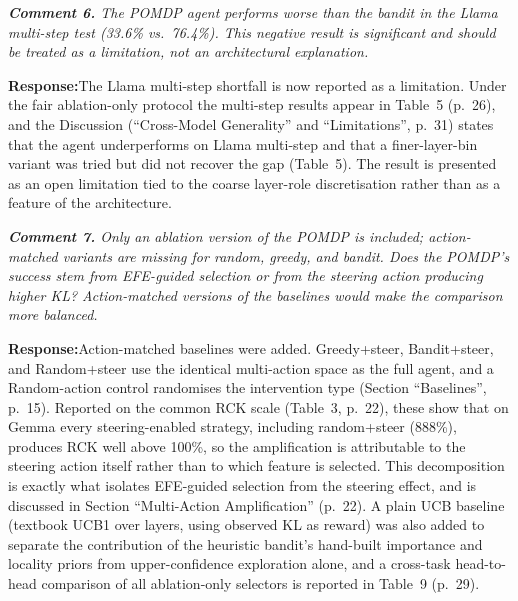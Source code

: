\documentclass[11pt]{article}
\newenvironment{comment}{%
  \def\FrameCommand{{\color{commentrule}\vrule width 3pt}\hspace{0pt}%
    \fboxsep=8pt\colorbox{commentbg}}%
  \MakeFramed{\advance\hsize-\width\FrameRestore}%
  \itshape\small}{\endMakeFramed}
\newcommand{\reviewerpoint}[1]{\medskip\noindent\textbf{Comment #1.}\;}
\newcommand{\response}{\par\smallskip\noindent\textbf{Response:}\;}
\begin{document}
\begin{comment}
\reviewerpoint{6} The POMDP agent performs worse than the bandit in the Llama
multi-step test (33.6\% vs.\ 76.4\%). This negative result is significant and
should be treated as a limitation, not an architectural explanation.
\end{comment}
\response The Llama multi-step shortfall is now reported as a limitation.
Under the fair ablation-only protocol the multi-step results appear in Table~5
(p.~26), and the Discussion (``Cross-Model Generality'' and ``Limitations'',
p.~31) states that the agent underperforms on Llama multi-step and that a
finer-layer-bin variant was tried but did not recover the gap (Table~5). The
result is presented as an open limitation tied to the coarse layer-role
discretisation rather than as a feature of the architecture.

\begin{comment}
\reviewerpoint{7} Only an ablation version of the POMDP is included; action-matched
variants are missing for random, greedy, and bandit. Does the POMDP's success stem
from EFE-guided selection or from the steering action producing higher KL?
Action-matched versions of the baselines would make the comparison more balanced.
\end{comment}
\response Action-matched baselines were added. Greedy+steer, Bandit+steer, and
Random+steer use the identical multi-action space as the full agent, and a
Random-action control randomises the intervention type
(Section ``Baselines'', p.~15). Reported on the common RCK scale (Table~3, p.~22),
these show that on Gemma every steering-enabled strategy, including random+steer
(888\%), produces RCK well above 100\%, so the amplification is attributable to
the steering action itself rather than to which feature is selected. This
decomposition is exactly what isolates EFE-guided selection from the steering
effect, and is discussed in Section ``Multi-Action Amplification'' (p.~22). A
plain UCB baseline (textbook UCB1 over layers, using observed KL as reward) was
also added to separate the contribution of the heuristic bandit's hand-built
importance and locality priors from upper-confidence exploration alone, and a
cross-task head-to-head comparison of all ablation-only selectors is reported in
Table~9 (p.~29).
\end{document}
